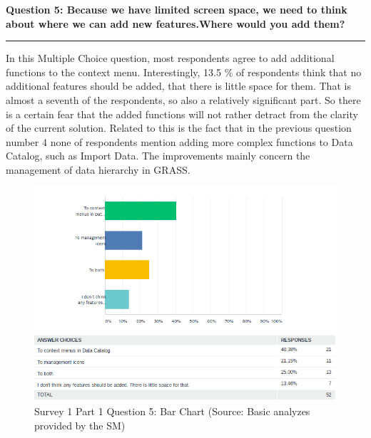 \documentclass[a4paper,10pt,twoside]{article}
\begin{document}
\newpage
\noindent \textbf{Question 5: Because we have limited screen space, we need to think about where we can add new features.Where would you add them?}
\par\noindent\rule{\textwidth}{0.4pt}
\noindent In this Multiple Choice question, most respondents agree to add additional functions to the context menu. Interestingly, 13.5 \% of respondents think that no additional features should be added, that there is little space for them. That is almost a seventh of the respondents, so also a relatively significant part. So there is a certain fear that the added functions will not rather detract from the clarity of the current solution. Related to this is the fact that in the previous question number 4 none of respondents mention adding more complex functions to Data Catalog, such as Import Data. The improvements mainly concern the management of data hierarchy in GRASS.

\vspace{0.3cm}
\begin{figure}[hbt!] 
\begin{center}
\includegraphics[width=17cm]{../surveys/analyzed_data/survey1_part1_question5_descriptive_stats_sm.png} 
\caption[Survey 1 Part 1 Question 5: Bar Chart]{Survey 1 Part 1 Question 5: Bar Chart (Source: Basic analyzes provided by the SM)}
\label{fig:survey1_part1_question5_descriptive_stats_sm}
\end{center}
\end{figure}
\end{document}
